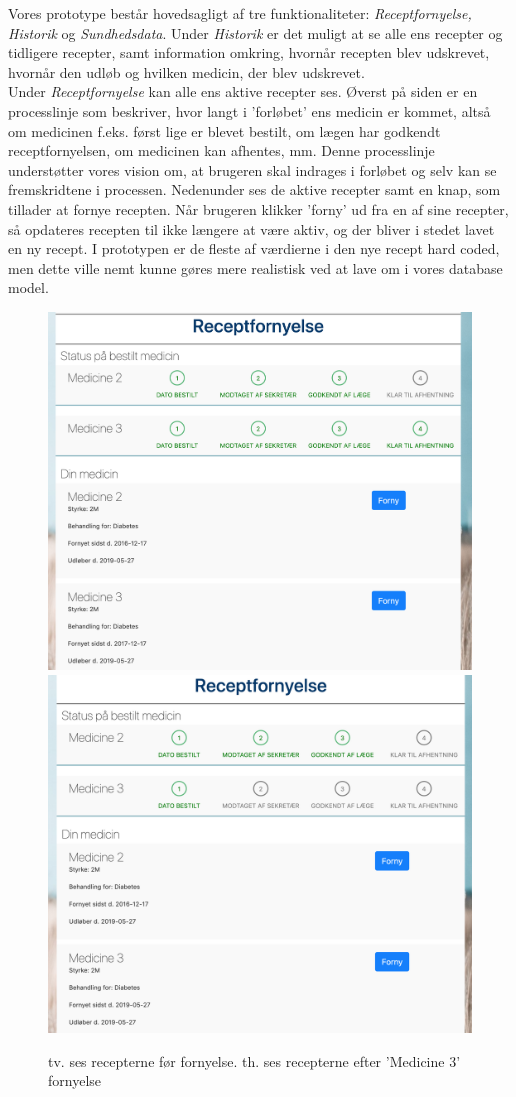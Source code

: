 Vores prototype består hovedsagligt af tre funktionaliteter: \textit{Receptfornyelse, Historik} og \textit{Sundhedsdata}. Under \textit{Historik} er det muligt at se alle ens recepter og tidligere recepter, samt information omkring, hvornår recepten blev udskrevet, hvornår den udløb og hvilken medicin, der blev udskrevet.\\
Under \textit{Receptfornyelse} kan alle ens aktive recepter ses. Øverst på siden er en processlinje som beskriver, hvor langt i 'forløbet' ens medicin er kommet, altså om medicinen f.eks. først lige er blevet bestilt, om lægen har godkendt receptfornyelsen, om medicinen kan afhentes, mm. Denne processlinje understøtter vores vision om, at brugeren skal indrages i forløbet og selv kan se fremskridtene i processen. Nedenunder ses de aktive recepter samt en knap, som tillader at fornye recepten. Når brugeren klikker 'forny' ud fra en af sine recepter, så opdateres recepten til ikke længere at være aktiv, og der bliver i stedet lavet en ny recept. I prototypen er de fleste af værdierne i den nye recept hard coded, men dette ville nemt kunne gøres mere realistisk ved at lave om i vores database model.
\begin{figure}[h!]
	\includegraphics[width=0.49\linewidth]{Materials/Prototype/Receptfornyelse}
	\includegraphics[width=0.49\linewidth]{Materials/Prototype/ReceptfornyelseFornyet}
	\caption{tv. ses recepterne før fornyelse. th. ses recepterne efter 'Medicine 3' fornyelse}
\end{figure}
